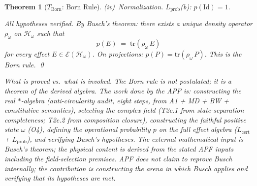 \documentclass[11pt,a4paper]{article}
\newtheorem{theorem}{Theorem}[section]
\theoremstyle{definition}
\newcommand{\tr}{\mathrm{tr}}
\begin{document}
\begin{theorem}[$T_{\mathrm{Born}}$: Born Rule]
\smallskip\noindent(iv)~\textit{Normalization.}  $L_{\mathrm{prob}}$(b): $p(\mathrm{Id}) = 1$.

\smallskip\noindent All hypotheses verified.  By Busch's theorem: there exists a unique density operator $\rho_\omega$ on $\mathcal{H}_\omega$ such that
\[
p(E) \;=\; \tr(\rho_\omega\, E)
\]
for every effect $E \in \mathcal{E}(\mathcal{H}_\omega)$.  On projections: $p(P) = \tr(\rho_\omega\,P)$.  This is the Born rule.  \qed

\smallskip\noindent\textit{What is proved vs.\ what is invoked.}  The Born rule is not postulated; it is a \emph{theorem} of the derived algebra.  The work done by the APF is: constructing the real $*$-algebra (anti-circularity audit, eight steps, from A1 + MD + BW + constitutive semantics), selecting the complex field (T2c.1 from state-separation completeness; T2c.2 from composition closure), constructing the faithful positive state $\omega$ (O4), defining the operational probability $p$ on the full effect algebra ($L_{\mathrm{cert}}$ + $L_{\mathrm{prob}}$), and verifying Busch's hypotheses.  The external mathematical input is Busch's theorem; the physical content is derived from the stated APF inputs including the field-selection premises.  APF does not claim to reprove Busch internally; the contribution is constructing the arena in which Busch applies and verifying that its hypotheses are met.
\end{theorem}
\end{document}
